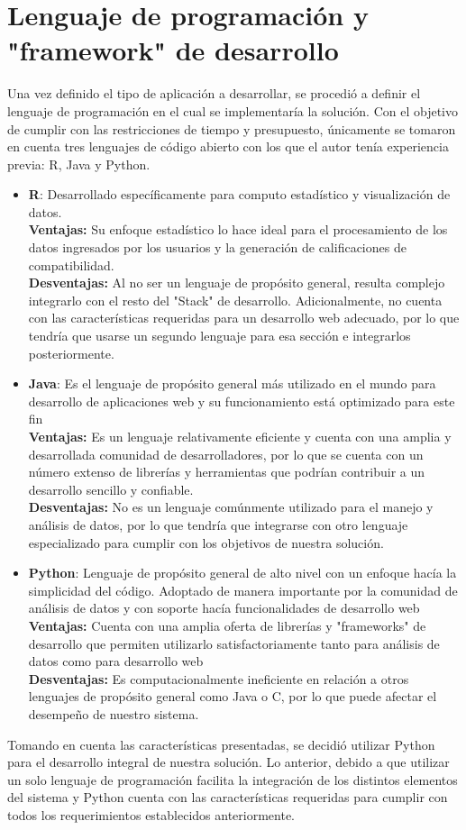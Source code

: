 	\section{Lenguaje de programación y "framework" de desarrollo}
		Una vez definido el tipo de aplicación a desarrollar, se procedió a definir el lenguaje de programación en el cual se implementaría la solución. Con el objetivo de cumplir con las restricciones de tiempo y presupuesto, únicamente se tomaron en cuenta tres lenguajes de código abierto con los que el autor tenía experiencia previa: R, Java y Python.
			\begin{itemize}
				\item \textbf{R}: Desarrollado específicamente para computo estadístico y visualización de datos. \\
					\textbf{Ventajas:} Su enfoque estadístico lo hace ideal para el procesamiento de los datos ingresados por los usuarios y la generación de calificaciones de compatibilidad.\\ 
					\textbf{Desventajas:} Al no ser un lenguaje de propósito general, resulta complejo integrarlo con el resto del "Stack" de desarrollo. Adicionalmente, no cuenta con las características requeridas para un desarrollo web adecuado, por lo que tendría que usarse un segundo lenguaje para esa sección e integrarlos posteriormente.
				\item \textbf{Java}: Es el lenguaje de propósito general más utilizado en el mundo para desarrollo de aplicaciones web y su funcionamiento está optimizado para este fin \\
					\textbf{Ventajas:} Es un lenguaje relativamente eficiente y cuenta con una amplia y desarrollada comunidad de desarrolladores, por lo que se cuenta con un número extenso de librerías y herramientas que podrían contribuir a un desarrollo sencillo y confiable. \\
					\textbf{Desventajas:} No es un lenguaje comúnmente utilizado para el manejo y análisis de datos, por lo que tendría que integrarse con otro lenguaje especializado para cumplir con los objetivos de nuestra solución.
				\item \textbf{Python}: Lenguaje de propósito general de alto nivel con un enfoque hacía la simplicidad del código. Adoptado de manera importante por la comunidad de análisis de datos y con soporte hacía funcionalidades de desarrollo web\\
					\textbf{Ventajas:} Cuenta con una amplia oferta de librerías y "frameworks" de desarrollo que permiten utilizarlo satisfactoriamente tanto para análisis de datos como para desarrollo web \\
					\textbf{Desventajas:} Es computacionalmente ineficiente en relación a otros lenguajes de propósito general como Java o C, por lo que puede afectar el desempeño de nuestro sistema.
			\end{itemize}
		Tomando en cuenta las características presentadas, se decidió utilizar Python para el desarrollo integral de nuestra solución. Lo anterior, debido a que utilizar un solo lenguaje de programación facilita la integración de los distintos elementos del sistema y Python cuenta con las características requeridas para cumplir con todos los requerimientos establecidos anteriormente.

